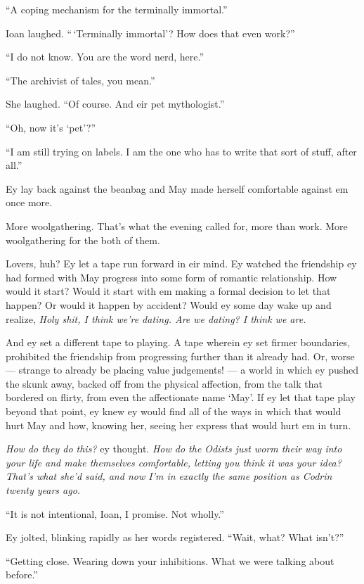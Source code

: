``A coping mechanism for the terminally immortal.''

Ioan laughed. ``\,`Terminally immortal'? How does that even work?''

``I do not know. You are the word nerd, here.''

``The archivist of tales, you mean.''

She laughed. ``Of course. And eir pet mythologist.''

``Oh, now it's `pet'?''

``I am still trying on labels. I am the one who has to write that sort of stuff, after all.''

Ey lay back against the beanbag and May made herself comfortable against em once more.

More woolgathering. That's what the evening called for, more than work. More woolgathering for the both of them.

Lovers, huh? Ey let a tape run forward in eir mind. Ey watched the friendship ey had formed with May progress into some form of romantic relationship. How would it start? Would it start with em making a formal decision to let that happen? Or would it happen by accident? Would ey some day wake up and realize, \emph{Holy shit, I think we're dating. Are we dating? I think we are.}

And ey set a different tape to playing. A tape wherein ey set firmer boundaries, prohibited the friendship from progressing further than it already had. Or, worse — strange to already be placing value judgements! — a world in which ey pushed the skunk away, backed off from the physical affection, from the talk that bordered on flirty, from even the affectionate name `May'. If ey let that tape play beyond that point, ey knew ey would find all of the ways in which that would hurt May and how, knowing her, seeing her express that would hurt em in turn.

\emph{How do they do this?} ey thought. \emph{How do the Odists just worm their way into your life and make themselves comfortable, letting you think it was your idea? That's what she'd said, and now I'm in exactly the same position as Codrin twenty years ago.}

``It is not intentional, Ioan, I promise. Not wholly.''

Ey jolted, blinking rapidly as her words registered. ``Wait, what? What isn't?''

``Getting close. Wearing down your inhibitions. What we were talking about before.''

